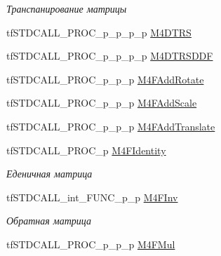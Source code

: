 \begin{DoxyCompactItemize}
\begin{DoxyCompactList}\small\item\em Транспанирование матрицы \end{DoxyCompactList}\item 
tf\-S\-T\-D\-C\-A\-L\-L\-\_\-\-P\-R\-O\-C\-\_\-p\-\_\-p\-\_\-p\-\_\-p \hyperlink{structs_functions_vector_c_p_u_a6731afe0f6d8690e6f862abf42e793a0}{M4\-D\-T\-R\-S}
\item 
tf\-S\-T\-D\-C\-A\-L\-L\-\_\-\-P\-R\-O\-C\-\_\-p\-\_\-p\-\_\-p\-\_\-p \hyperlink{structs_functions_vector_c_p_u_af3e24790cedd13e895e40434a6e5f64b}{M4\-D\-T\-R\-S\-D\-D\-F}
\item 
tf\-S\-T\-D\-C\-A\-L\-L\-\_\-\-P\-R\-O\-C\-\_\-p\-\_\-p\-\_\-p \hyperlink{structs_functions_vector_c_p_u_a697330df2989aafe56b6984f243eb198}{M4\-F\-Add\-Rotate}
\item 
tf\-S\-T\-D\-C\-A\-L\-L\-\_\-\-P\-R\-O\-C\-\_\-p\-\_\-p\-\_\-p \hyperlink{structs_functions_vector_c_p_u_af7c7ce3ce07d9113dd96599b76759b12}{M4\-F\-Add\-Scale}
\item 
tf\-S\-T\-D\-C\-A\-L\-L\-\_\-\-P\-R\-O\-C\-\_\-p\-\_\-p\-\_\-p \hyperlink{structs_functions_vector_c_p_u_a36516b1c082bc6bc44b106868aba1ac5}{M4\-F\-Add\-Translate}
\item 
\hypertarget{structs_functions_vector_c_p_u_aa85fbc262534ef31b1860b882232cf19}{tf\-S\-T\-D\-C\-A\-L\-L\-\_\-\-P\-R\-O\-C\-\_\-p \hyperlink{structs_functions_vector_c_p_u_aa85fbc262534ef31b1860b882232cf19}{M4\-F\-Identity}}\label{structs_functions_vector_c_p_u_aa85fbc262534ef31b1860b882232cf19}

\begin{DoxyCompactList}\small\item\em Еденичная матрица \end{DoxyCompactList}\item 
\hypertarget{structs_functions_vector_c_p_u_a2ffec936c506d351f71b809582350a78}{tf\-S\-T\-D\-C\-A\-L\-L\-\_\-int\-\_\-\-F\-U\-N\-C\-\_\-p\-\_\-p \hyperlink{structs_functions_vector_c_p_u_a2ffec936c506d351f71b809582350a78}{M4\-F\-Inv}}\label{structs_functions_vector_c_p_u_a2ffec936c506d351f71b809582350a78}

\begin{DoxyCompactList}\small\item\em Обратная матрица \end{DoxyCompactList}\item 
\hypertarget{structs_functions_vector_c_p_u_a860c42ffdf567d1b02f650b4e2e21098}{tf\-S\-T\-D\-C\-A\-L\-L\-\_\-\-P\-R\-O\-C\-\_\-p\-\_\-p\-\_\-p \hyperlink{structs_functions_vector_c_p_u_a860c42ffdf567d1b02f650b4e2e21098}{M4\-F\-Mul}}\label{structs_functions_vector_c_p_u_a860c42ffdf567d1b02f650b4e2e21098}


\end{DoxyCompactItemize}
